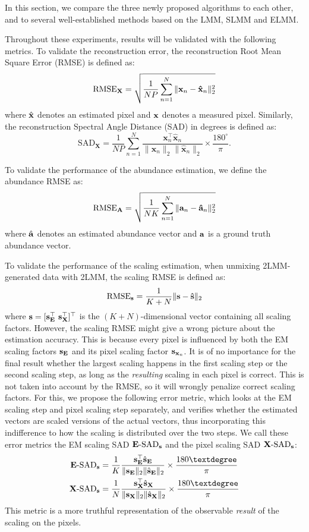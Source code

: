 In this section, we compare the three newly proposed algorithms to each other, and to several well-established methods based on the LMM, SLMM and ELMM. 

Throughout these experiments, results will be validated with the following metrics.
To validate the reconstruction error, the reconstruction Root Mean Square Error (RMSE) 
is defined as:
\[
\mathrm{RMSE}_\mathbf{X} = \sqrt{\frac{1}{NP} \sum_{n=1}^N \|\mathbf{\mathbf{x}}_n - \mathbf{\hat{\mathbf{x}}}_n\|^2_2}
\]
where $\hat{\mathbf{x}}$ denotes an estimated pixel and $\mathbf{x}$ denotes a measured pixel. 
Similarly, the reconstruction Spectral Angle Distance (SAD) in degrees is defined as:
\[
\mathrm{SAD}_\mathbf{X} = \frac{1}{NP} \sum_{n=1}^N \frac{\mathbf{x}_n^\top \mathbf{\hat{x}}_n}{\|\mathbf{x}_n\|_2 \|\mathbf{\hat{x}}_n\|_2} \times \frac{180^\circ}{\pi}.
\]

To validate the performance of the abundance estimation, we define the abundance RMSE as:
\[
\mathrm{RMSE}_\mathbf{A} = \sqrt{\frac{1}{NK} \sum_{n=1}^N \|\mathbf{a}_n - \mathbf{\hat{\mathbf{a}}}_n\|^2_2}
\]
where $\hat{\mathbf{a}}$ denotes an estimated abundance vector and $\mathbf{a}$ is a ground truth abundance vector. 

To validate the performance of the scaling estimation, 
when unmixing 2LMM-generated data with 2LMM, the scaling RMSE is defined as:
\[
\mathrm{RMSE}_\mathbf{s} = \frac{1}{K+N}\|\mathbf{s} - \mathbf{\hat{\mathbf{s}}}\|_2
\]
where $\mathbf{s} = [\mathbf{s}_{\mathbf{E}}^\top~\mathbf{s}_{\mathbf{X}}^\top]^\top$ is the $(K+N)$-dimensional vector containing all scaling factors. However, the scaling RMSE might give a wrong picture about the estimation accuracy. This is because every pixel is influenced by both the EM scaling factors $\mathbf{s}_{\mathbf{E}}$ and its pixel scaling factor $\mathbf{s}_{\mathbf{x}_n}$. It is of no importance for the final result whether the largest scaling happens in the first scaling step or the second scaling step, as long as the \textit{resulting} scaling in each pixel is correct. This is not taken into account by the RMSE, so it will wrongly penalize correct scaling factors. For this, we propose the following error metric, which looks at the EM scaling step and pixel scaling step separately, and verifies whether the estimated vectors are scaled versions of the actual vectors, thus incorporating this indifference to how the scaling is distributed over the two steps. We call these error metrics the EM scaling SAD $\mathbf{E}\text{-}\mathrm{SAD}_{\mathbf{s}}$ and the pixel scaling SAD $\mathbf{X}\text{-}\mathrm{SAD}_{\mathbf{s}}$:
\begin{align*}
    \esad &= \frac{1}{K} \frac{\s_\E^\top\hat{\s}_\E}{\|\s_\E\|_2\|\hat{\s}_\E\|_2} \times \frac{180°}{\pi} \\
    \xsad &= \frac{1}{N} \frac{\s_\X^\top\hat{\s}_\X}{\|\s_\X\|_2\|\hat{\s}_\X\|_2} \times \frac{180°}{\pi}
\end{align*}
This metric is a more truthful representation of the observable \textit{result} of the scaling on the pixels.

